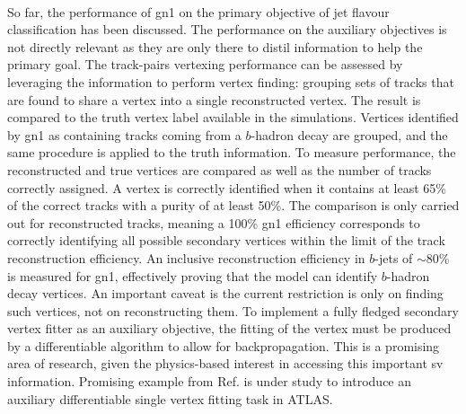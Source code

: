 \paragraph{}So far, the performance of \gls{gn1} on the primary objective of jet flavour classification has been discussed. The performance on the auxiliary objectives is not directly relevant as they are only there to distil information to help the primary goal. The track-pairs vertexing performance can be assessed by leveraging the information to perform vertex finding: grouping sets of tracks that are found to share a vertex into a single reconstructed vertex. The result is compared to the truth vertex label available in the simulations. Vertices identified by \gls{gn1} as containing tracks coming from a $b$-hadron decay are grouped, and the same procedure is applied to the truth information. To measure performance, the reconstructed and true vertices are compared as well as the number of tracks correctly assigned. A vertex is correctly identified when it contains at least 65\% of the correct tracks with a purity of at least 50\%. The comparison is only carried out for reconstructed tracks, meaning a 100\% \gls{gn1} efficiency corresponds to correctly identifying all possible secondary vertices within the limit of the track reconstruction efficiency. An inclusive reconstruction efficiency in $b$-jets of $\sim$80\% is measured for \gls{gn1}, effectively proving that the model can identify $b$-hadron decay vertices. An important caveat is the current restriction is only on finding such vertices, not on reconstructing them. To implement a fully fledged secondary vertex fitter as an auxiliary objective, the fitting of the vertex must be produced by a differentiable algorithm to allow for backpropagation. This is a promising area of research, given the physics-based interest in accessing this important \gls{sv} information. Promising example from Ref. \cite{smith2023differentiable} is under study to introduce an auxiliary differentiable single vertex fitting task in ATLAS. \\

